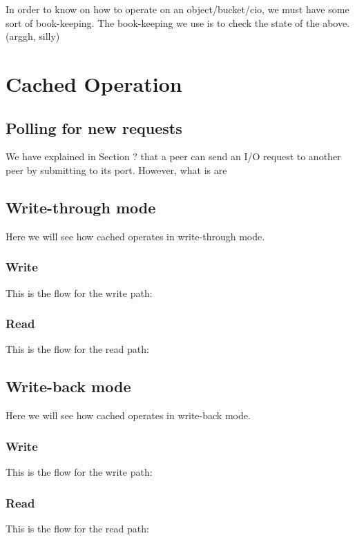 In order to know on how to operate on an object/bucket/cio, we must have some 
sort of book-keeping. The book-keeping we use is to check the state of the 
above. (arggh, silly)

\section{Cached Operation}\label{sec:op-design}

\subsection{Polling for new requests}

We have explained in Section ? that a peer can send an I/O request to another 
peer by submitting to its port. However, what is are


\begin{comment}
Let's attempt to make the above a bit clearer. When cached receives a request, 
it first checks the request target (i.e. the object name and then calculates 
which bucket objects are within the request's range. It is easy to see that this 
is a 1:1 mapping to the object's data.
\end{comment}

\subsection{Write-through mode}

Here we will see how cached operates in write-through mode.

\subsubsection{Write}

This is the flow for the write path:

\subsubsection{Read}

This is the flow for the read path:

\subsection{Write-back mode}

Here we will see how cached operates in write-back mode.

\subsubsection{Write}

This is the flow for the write path:

\subsubsection{Read}

This is the flow for the read path:

